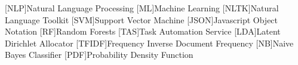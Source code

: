 \documentclass[a4paper,11pt,svgnames]{book}
\begin{document}
	[NLP]{Natural Language Processing}
	[ML]{Machine Learning}
	[NLTK]{Natural Language Toolkit}
	[SVM]{Support Vector Machine}
	[JSON]{Javascript Object Notation}
	[RF]{Random Forests}
	[TAS]{Task Automation Service}
	[LDA]{Latent Dirichlet Allocator}
	[TFIDF]{Frequency Inverse Document Frequency}
	[NB]{Naive Bayes Classifier}
	[PDF]{Probability Density Function}
	\newcommand\litem[1]{\item{\bfseries #1 }}
	\renewcommand{\arraystretch}{1.5} %
	
	\newcommand\headcell[1]{%
	  \multicolumn{1}{|c|}{\cellcolor{DodgerBlue}\bfseries\sffamily\textcolor{white}{#1}}
	}
	
	
	
	
		
	
	
	
	
	
	
	
	
	\pagestyle{fancy}
	\fancyhf{}
	\fancyhead[RO]{\sffamily \slshape \rightmark}
	\fancyhead[LE]{\sffamily \slshape \leftmark}
	\fancyfoot[OR,EL]{\rmfamily \thepage} %
	
	
	
	
	
	
	
	
	
	
	
	\appendix
	
	\nocite{*}
	
	{
	\small
	
	}
	
\end{document}
